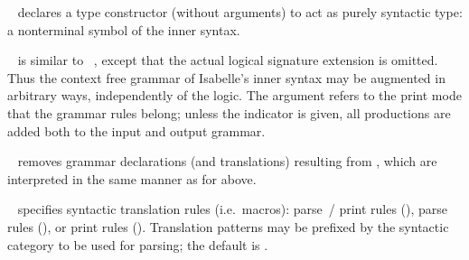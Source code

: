 \begin{isabellebody}
\begin{isamarkuptext}
  \begin{description}

  \item \hyperlink{command.nonterminal}{\mbox{}}~ declares a type
  constructor  (without arguments) to act as purely syntactic
  type: a nonterminal symbol of the inner syntax.

  \item \hyperlink{command.syntax}{\mbox{}}~ is similar to
  \hyperlink{command.consts}{\mbox{}}~, except that the actual logical
  signature extension is omitted.  Thus the context free grammar of
  Isabelle's inner syntax may be augmented in arbitrary ways,
  independently of the logic.  The  argument refers to the
  print mode that the grammar rules belong; unless the \hyperlink{keyword.output}{\mbox{}} indicator is given, all productions are added both to the
  input and output grammar.

  \item \hyperlink{command.no-syntax}{\mbox{}}~ removes grammar
  declarations (and translations) resulting from , which
  are interpreted in the same manner as for \hyperlink{command.syntax}{\mbox{}} above.

  \item \hyperlink{command.translations}{\mbox{}}~ specifies syntactic
  translation rules (i.e.\ macros): parse~/ print rules (),
  parse rules (), or print rules ().
  Translation patterns may be prefixed by the syntactic category to be
  used for parsing; the default is .


\end{description}
\end{isamarkuptext}
\end{isabellebody}
